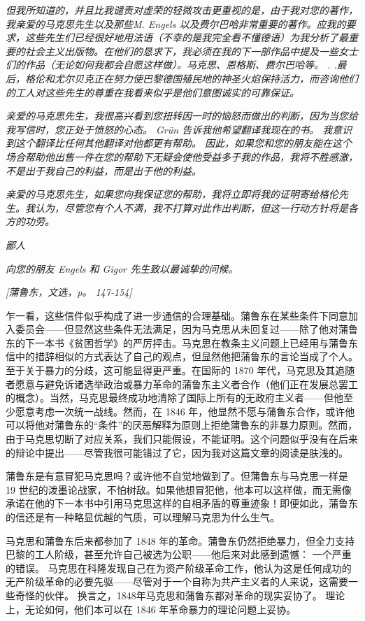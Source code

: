 \documentclass[DIV=12,%
               BCOR=0mm,%
               headinclude=false,%
               footinclude=false,open=any,%
               fontsize=10pt,%
               oneside,%
               paper=210mm:11in]%
               {scrbook}
\begin{document}
\emph{但我所知道的，并且比我谴责对虚荣的轻微攻击更重视的是，由于我对您的著作，我亲爱的马克思先生以及那些M. Engels 以及费尔巴哈非常重要的著作。应我的要求，这些先生们已经很好地用法语（不幸的是我完全看不懂德语）为我分析了最重要的社会主义出版物。在他们的恳求下，我必须在我的下一部作品中提及一些女士们的作品（无论如何我都会自愿这样做）。马克思、恩格斯、费尔巴哈等。 . .最后，格伦和尤尔贝克正在努力使巴黎德国殖民地的神圣火焰保持活力，而咨询他们的工人对这些先生的尊重在我看来似乎是他们意图诚实的可靠保证。}


\emph{亲爱的马克思先生，我很高兴看到您扭转因一时的恼怒而做出的判断，因为当您给我写信时，您正处于愤怒的心态。 Grün 告诉我他希望翻译我现在的书。 我意识到这个翻译比任何其他翻译对他都更有帮助。 因此，如果您和您的朋友能在这个场合帮助他出售一件在您的帮助下无疑会使他受益多于我的作品，我将不胜感激，不是出于我自己的利益，而是出于他的利益。}


\emph{亲爱的马克思先生，如果您向我保证您的帮助，我将立即将我的证明寄给格伦先生。我认为，尽管您有个人不满，我不打算对此作出判断，但这一行动方针将是各方的功劳。}


\emph{鄙人}


\emph{向您的朋友 Engels 和 Gigor 先生致以最诚挚的问候。}


\emph{[蒲鲁东，文选，p。 147-154]}


乍一看，这些信件似乎构成了进一步通信的合理基础。蒲鲁东在某些条件下同意加入委员会——但显然这些条件无法满足，因为马克思从未回复过——除了他对蒲鲁东的下一本书《贫困哲学》的严厉抨击。马克思在教条主义问题上已经用与蒲鲁东信中的措辞相似的方式表达了自己的观点，但显然他把蒲鲁东的言论当成了个人。至于关于暴力的分歧，这可能显得更严重。在国际的 1870 年代，马克思及其追随者愿意与避免诉诸选举政治或暴力革命的蒲鲁东主义者合作（他们正在发展总罢工的概念）。当然，马克思最终成功地清除了国际上所有的无政府主义者——但他至少愿意考虑一次统一战线。然而，在 1846 年，他显然不愿与蒲鲁东合作，或许他可以将他对蒲鲁东的“条件”的厌恶解释为原则上拒绝蒲鲁东的非暴力原则。然而，由于马克思切断了对应关系，我们只能假设，不能证明。这个问题似乎没有在后来的辩论中提出——尽管我很可能错过了它，因为我对这篇文章的阅读是肤浅的。


蒲鲁东是有意冒犯马克思吗？或许他不自觉地做到了。但蒲鲁东与马克思一样是 19 世纪的泼墨论战家，不怕树敌。如果他想冒犯他，他本可以这样做，而无需像承诺在他的下一本书中引用马克思这样的自相矛盾的尊重迹象！即便如此，蒲鲁东的信还是有一种略显优越的气质，可以理解马克思为什么生气。


马克思和蒲鲁东后来都参加了 1848 年的革命。蒲鲁东仍然拒绝暴力，但全力支持巴黎的工人阶级，甚至允许自己被选为公职——他后来对此感到遗憾： 一个严重的错误。 马克思在科隆发现自己在为资产阶级革命工作，他认为这是任何成功的无产阶级革命的必要先驱——尽管对于一个自称为共产主义者的人来说，这需要一些奇怪的伙伴。 换言之，1848年马克思和蒲鲁东都对革命的现实妥协了。 理论上，无论如何，他们本可以在 1846 年革命暴力的理论问题上妥协。
\end{document}
